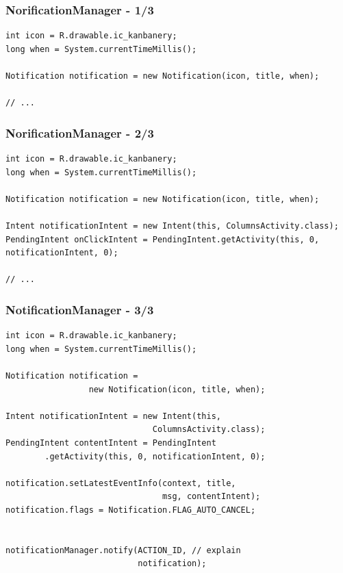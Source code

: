 \documentclass{beamer}
\begin{document}
\begin{frame}[fragile]\frametitle{NorificationManager - 1/3}
\begin{lstlisting}
int icon = R.drawable.ic_kanbanery;
long when = System.currentTimeMillis();

Notification notification = new Notification(icon, title, when);

// ...
\end{lstlisting}
\end{frame}


\begin{frame}[fragile]\frametitle{NorificationManager - 2/3}
\begin{lstlisting}
int icon = R.drawable.ic_kanbanery;
long when = System.currentTimeMillis();

Notification notification = new Notification(icon, title, when);

Intent notificationIntent = new Intent(this, ColumnsActivity.class);
PendingIntent onClickIntent = PendingIntent.getActivity(this, 0, notificationIntent, 0);

// ...
\end{lstlisting}
\end{frame}

\begin{frame}[fragile]\frametitle{NotificationManager - 3/3}
\begin{lstlisting}
int icon = R.drawable.ic_kanbanery;
long when = System.currentTimeMillis();

Notification notification = 
                 new Notification(icon, title, when);

Intent notificationIntent = new Intent(this, 
                              ColumnsActivity.class);
PendingIntent contentIntent = PendingIntent
        .getActivity(this, 0, notificationIntent, 0);

notification.setLatestEventInfo(context, title, 
                                msg, contentIntent);
notification.flags = Notification.FLAG_AUTO_CANCEL;


notificationManager.notify(ACTION_ID, // explain 
                           notification);
\end{lstlisting}
\end{frame}
\end{document}
